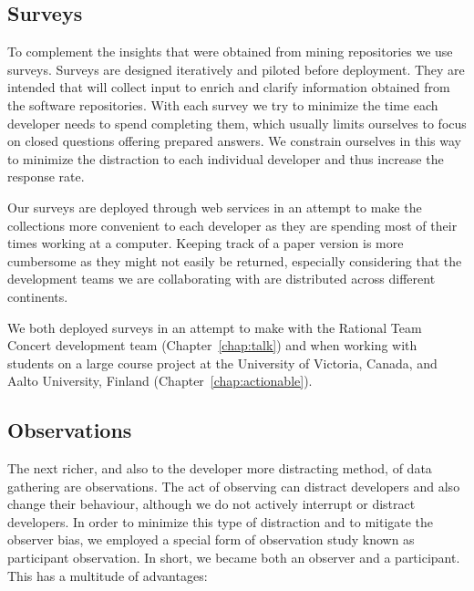 \subsection{Surveys}
To complement the insights that were obtained from mining repositories we use surveys.
Surveys are designed iteratively and piloted before deployment.
They are intended that will collect input to enrich and clarify information obtained from the software repositories. 
With each survey we try to minimize the time each developer needs to spend completing them, which usually limits ourselves to focus on closed questions offering prepared answers.
We constrain ourselves in this way to minimize the distraction to each individual developer and thus increase the response rate.

Our surveys are deployed through web services in an attempt to make the collections more convenient to each developer as they are spending most of their times working at a computer.
Keeping track of a paper version is more cumbersome as they might not easily be returned, especially considering that the development teams we are collaborating with are distributed across different continents.

We both deployed surveys in an attempt to make with the Rational Team Concert development team (Chapter~\ref{chap:talk}) and when working with students on a large course project at the University of Victoria, Canada, and Aalto University, Finland (Chapter~\ref{chap:actionable}).


\subsection{Observations}
The next richer, and also to the developer more distracting method, of data gathering are observations.
The act of observing can distract developers and also change their behaviour, although we do not actively interrupt or distract developers.
In order to minimize this type of distraction and to mitigate the observer bias, we employed a special form of observation study known as participant observation.
In short, we became both an observer and a participant.
%
This has a multitude of advantages:

